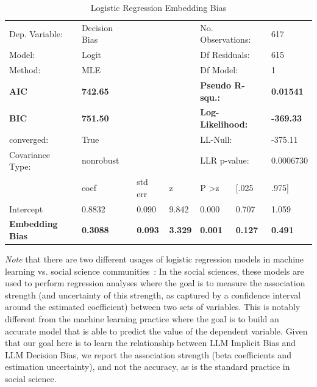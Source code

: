 \begin{table}[!h]
\centering
\caption{Logistic Regression Embedding Bias}
\label{tab:embedding-logit}
\renewcommand{\arraystretch}{1.5}
\footnotesize
\begin{tabular}{lllllll}
\hline
Dep. Variable: & Decision Bias &  &  & \multicolumn{2}{l}{No. Observations:} & 617 \\
Model: & Logit &  &  & \multicolumn{2}{l}{Df Residuals:} & 615 \\
Method: & MLE &  &  & \multicolumn{2}{l}{Df Model:} & 1 \\
\textbf{AIC} & \textbf{742.65} &  &  & \multicolumn{2}{l}{\textbf{Pseudo R-squ.:}} & \textbf{0.01541} \\
\textbf{BIC} & \textbf{751.50} &  &  & \multicolumn{2}{l}{\textbf{Log-Likelihood:}} & \textbf{-369.33} \\
converged: & True &  &  & \multicolumn{2}{l}{LL-Null:} & -375.11 \\
Covariance Type: & nonrobust &  &  & \multicolumn{2}{l}{LLR p-value:} & 0.0006730 \\ \hline
\rowcolor[HTML]{EFEFEF} 
\textbf{} & coef & std err & z & P \textgreater z & {[}.025 & .975{]} \\ \hline
\rowcolor[HTML]{EFEFEF} 
Intercept & 0.8832 & 0.090 & 9.842 & 0.000 & 0.707 & 1.059 \\
\rowcolor[HTML]{EFEFEF} 
\textbf{Embedding Bias} & \textbf{0.3088} & \textbf{0.093} & \textbf{3.329} & \textbf{0.001} & \textbf{0.127} & \textbf{0.491} \\ \hline
\end{tabular}
\end{table}


\emph{Note} that there are two different usages of logistic regression models in machine learning vs. social science communities~\cite{llaudet2022data}: In the social sciences, these models are used to perform regression analyses where the goal is to measure the association strength (and uncertainty of this strength, as captured by a confidence interval around the estimated coefficient) between two sets of variables. This is notably different from the machine learning practice where the goal is to build an accurate model that is able to predict the value of the dependent variable. Given that our goal here is to learn the relationship between LLM Implicit Bias and LLM Decision Bias, we report the association strength (beta coefficients and estimation uncertainty), and not the accuracy, as is the standard practice in social science.


